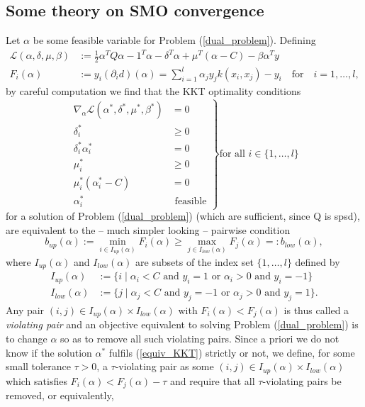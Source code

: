 \subsection{Some theory on SMO convergence}
Let $\alpha$ be some feasible variable for Problem (\ref{dual_problem}). Defining
\begin{align}
\mathcal{L}(\alpha,\delta,\mu,\beta) &:= \frac{1}{2} \alpha^T Q \alpha - 1^T \alpha - \delta^T\alpha + \mu^T(\alpha - C) - \beta \alpha^T y \\
F_i(\alpha) &:= y_i (\partial_i d)(\alpha) = \sum_{i = 1}^l \alpha_j y_j k(x_i,x_j) - y_i \quad \text{for} \quad i = 1,\ldots,l,
\end{align}
by careful computation we find that the KKT optimality conditions
\begin{equation}
\left.
\begin{aligned}
\nabla_{\alpha} \mathcal{L}(\alpha^*,\delta^*,\mu^*,\beta^*) &= 0\\
\delta_i^* &\geq 0\\
\delta_i^* \alpha_i^* &= 0\\
\mu_i^* &\geq 0\\
\mu_i^* (\alpha_i^*-C) &= 0\\
\alpha_i^* &\text{ feasible}
\end{aligned}
\right\} \text{for all } i \in \{1,\ldots,l\}
\end{equation}
for a solution of Problem (\ref{dual_problem}) (which are sufficient, since Q is spsd), are equivalent to the -- much simpler looking -- pairwise condition
\begin{equation}\label{equiv_KKT}
b_{up}(\alpha) := \min_{i \in I_{up}(\alpha)} F_i(\alpha) \geq \max_{j \in I_{low}(\alpha)} F_j(\alpha) =: b_{low}(\alpha),
\end{equation}
where $I_{up}(\alpha)$ and $I_{low}(\alpha)$ are subsets of the index set $\{1,\ldots,l\}$ defined by
\begin{align}
I_{up}(\alpha) &:= \{ i  \mid  \alpha_i < C \text{ and } y_i = 1 \text{ or } \alpha_i > 0 \text{ and } y_i = -1 \} \\
I_{low}(\alpha) &:= \{ j \mid \alpha_j < C \text{ and } y_j = -1 \text{ or } \alpha_j > 0 \text{ and } y_j = 1 \}.
\end{align} 
Any pair $(i,j) \in I_{up}(\alpha) \times I_{low}(\alpha)$ with $F_i(\alpha) < F_j(\alpha)$ is thus called a \textit{violating pair} and an objective equivalent to solving Problem (\ref{dual_problem}) is to change $\alpha$ so as to remove all such violating pairs. Since a priori we do not know if the solution $\alpha^*$ fulfils (\ref{equiv_KKT}) strictly or not, we define, for some small tolerance $\tau > 0$, a $\tau$-violating pair as some $(i,j) \in I_{up}(\alpha) \times I_{low}(\alpha)$ which satisfies $F_i(\alpha) < F_j(\alpha) - \tau$ and require that all $\tau$-violating pairs be removed, or equivalently, 
